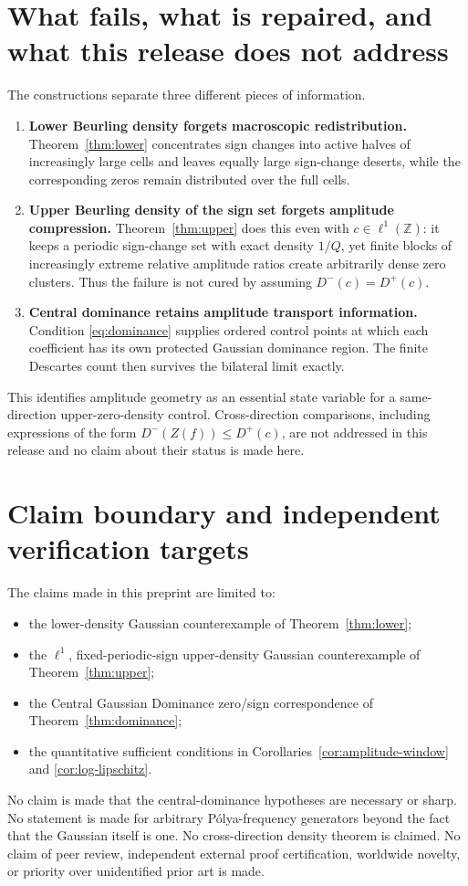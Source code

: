 \documentclass[11pt]{article}
\newcommand{\Z}{\mathbb{Z}}
\begin{document}
\section{What fails, what is repaired, and what this release does not address}
The constructions separate three different pieces of information.
\begin{enumerate}[leftmargin=2.1em]
  \item \textbf{Lower Beurling density forgets macroscopic redistribution.} Theorem~\ref{thm:lower} concentrates sign changes into active halves of increasingly large cells and leaves equally large sign-change deserts, while the corresponding zeros remain distributed over the full cells.
  \item \textbf{Upper Beurling density of the sign set forgets amplitude compression.} Theorem~\ref{thm:upper} does this even with $c\in\ell^1(\Z)$: it keeps a periodic sign-change set with exact density $1/Q$, yet finite blocks of increasingly extreme relative amplitude ratios create arbitrarily dense zero clusters. Thus the failure is not cured by assuming $D^-(c)=D^+(c)$.
  \item \textbf{Central dominance retains amplitude transport information.} Condition \eqref{eq:dominance} supplies ordered control points at which each coefficient has its own protected Gaussian dominance region. The finite Descartes count then survives the bilateral limit exactly.
\end{enumerate}
This identifies amplitude geometry as an essential state variable for a same-direction upper-zero-density control. Cross-direction comparisons, including expressions of the form $D^-(Z(f))\le D^+(c)$, are not addressed in this release and no claim about their status is made here.

\section{Claim boundary and independent verification targets}
The claims made in this preprint are limited to:
\begin{itemize}[leftmargin=2em]
  \item the lower-density Gaussian counterexample of Theorem~\ref{thm:lower};
  \item the $\ell^1$, fixed-periodic-sign upper-density Gaussian counterexample of Theorem~\ref{thm:upper};
  \item the Central Gaussian Dominance zero/sign correspondence of Theorem~\ref{thm:dominance};
  \item the quantitative sufficient conditions in Corollaries~\ref{cor:amplitude-window} and \ref{cor:log-lipschitz}.
\end{itemize}
No claim is made that the central-dominance hypotheses are necessary or sharp. No statement is made for arbitrary P\'olya-frequency generators beyond the fact that the Gaussian itself is one. No cross-direction density theorem is claimed. No claim of peer review, independent external proof certification, worldwide novelty, or priority over unidentified prior art is made.
\end{document}
